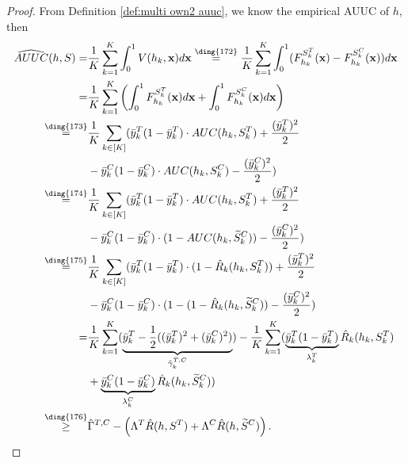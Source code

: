 \documentclass{article}
\def\vx{{\mathbf{x}}}
\def\eqone{\overset{\text{\ding{172}}}{=}}
\def\eqtwo{\overset{\text{\ding{173}}}{=}}
\def\eqthree{\overset{\text{\ding{174}}}{=}}
\def\eqfour{\overset{\text{\ding{175}}}{=}}
\def\geqfive{\overset{\text{\ding{176}}}{\geq}}%
\begin{document}

\begin{proof} From Definition \ref{def:multi own2 auuc}, we know the empirical AUUC of $h$, then 
\begin{align*}
    \widehat{AUUC} (h,S) = & \frac{1}{K} \sum_{k=1}^K \int_{0}^{1} V(h_k,\vx) d \vx 
    \eqone   \frac{1}{K} \sum_{k=1}^K \int_{0}^{1} ( F_{h_k}^{S^T_k}(\vx) - F_{h_k}^{S^C_k}(\vx) ) d \vx \\
    = & \frac{1}{K} \sum_{k=1}^K \left( \int_{0}^{1} F_{h_k}^{S^T_k}(\vx) d \vx + \int_{0}^{1} F_{h_k}^{S^C_k}(\vx) d \vx \right) \\
    \eqtwo & \frac{1}{K} \sum_{k \in [K]} ( \bar{y}_k^T (1-\bar{y}_k^T) \cdot AUC(h_k, S_k^T) + \frac{(\bar{y}_k^T)^2}{2}  
    \\ & - \bar{y}_k^C (1-\bar{y}_k^C) \cdot AUC(h_k, S_k^C) -  \frac{(\bar{y}_k^C)^2}{2} ) \\
    \eqthree & \frac{1}{K} \sum_{k \in [K]} ( \bar{y}_k^T (1-\bar{y}_k^T) \cdot AUC(h_k, S_k^T) + \frac{(\bar{y}_k^T)^2}{2}  
    \\ & - \bar{y}_k^C (1-\bar{y}_k^C) \cdot (1 - AUC(h_k, \widetilde{S}_k^C))  - \frac{(\bar{y}_k^C)^2}{2} ) \\
    \eqfour & \frac{1}{K} \sum_{k \in [K]} ( \bar{y}_k^T (1-\bar{y}_k^T) \cdot (1 - \hat{R}_k (h_k, S_k^T)) + \frac{(\bar{y}_k^T)^2}{2}  
    \\ & -   \bar{y}_k^C (1-\bar{y}_k^C) \cdot (1 - (1 - \hat{R}_k (h_k, \widetilde{S}_k^C)) - \frac{(\bar{y}_k^C)^2}{2} ) \\
    = & \frac{1}{K} \sum_{k = 1}^K  ( \underbrace{ \bar{y}_k^T - \frac{1}{2} ((\bar{y}_k^T)^2 + (\bar{y}_k^C)^2) }_{\hat{\gamma}_k^{T,C}}  )  
    -   \frac{1}{K} \sum_{k=1}^K ( \underbrace{ \bar{y}_k^T (1-\bar{y}_k^T) }_{\lambda_k^T} \hat{R}_k(h_k,S_k^T)  
    \\ & +   \underbrace{ \bar{y}_k^C (1-\bar{y}_k^C) }_{\lambda_k^C} \hat{R}_k(h_k,\widetilde{S}_k^C) ) \\
    \geqfive & \hat{\Gamma}^{T,C} -  \left( \Lambda^T \hat{R}(h,S^T) + \Lambda^C \hat{R}(h,\widetilde{S}^C) \right).
\end{align*}

\end{proof}
\end{document}
